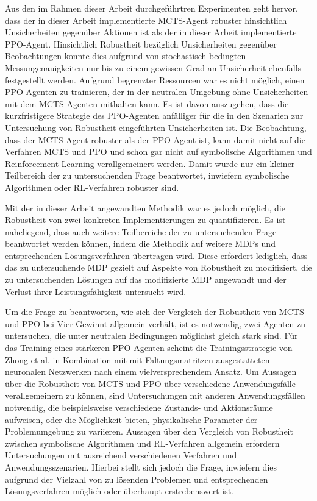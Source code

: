 Aus den im Rahmen dieser Arbeit durchgeführtren Experimenten geht hervor, dass der in dieser Arbeit implementierte MCTS-Agent robuster hinsichtlich Unsicherheiten gegenüber Aktionen ist als der in dieser Arbeit implementierte PPO-Agent. Hinsichtlich Robustheit bezüglich Unsicherheiten gegenüber Beobachtungen konnte dies aufgrund von stochastisch bedingten Messungenauigkeiten nur bis zu einem gewissen Grad an Unsicherheit ebenfalls festgestellt werden. Aufgrund begrenzter Ressourcen war es nicht möglich, einen PPO-Agenten zu trainieren, der in der neutralen Umgebung ohne Unsicherheiten mit dem MCTS-Agenten mithalten kann. Es ist davon auszugehen, dass die kurzfristigere Strategie des PPO-Agenten anfälliger für die in den Szenarien zur Untersuchung von Robustheit eingeführten Unsicherheiten ist. Die Beobachtung, dass der MCTS-Agent robuster als der PPO-Agent ist, kann damit nicht auf die Verfahren MCTS und PPO und schon gar nicht auf symbolische Algorithmen und Reinforcement Learning verallgemeinert werden. Damit wurde nur ein kleiner Teilbereich der zu untersuchenden Frage beantwortet, inwiefern symbolische Algorithmen oder RL-Verfahren robuster sind.

Mit der in dieser Arbeit angewandten Methodik war es jedoch möglich, die Robustheit von zwei konkreten Implementierungen zu quantifizieren. Es ist naheliegend, dass auch weitere Teilbereiche der zu untersuchenden Frage beantwortet werden können, indem die Methodik auf weitere MDPs und entsprechenden Lösungsverfahren übertragen wird. Diese erfordert lediglich, dass das zu untersuchende MDP gezielt auf Aspekte von Robustheit zu modifiziert, die zu untersuchenden Lösungen auf das modifizierte MDP angewandt und der Verlust ihrer Leistungsfähigkeit untersucht wird.

Um die Frage zu beantworten, wie sich der Vergleich der Robustheit von MCTS und PPO bei Vier Gewinnt allgemein verhält, ist es notwendig, zwei Agenten zu untersuchen, die unter neutralen Bedingungen möglichst gleich stark sind. Für das Training eines stärkeren PPO-Agenten scheint die Trainingsstrategie von Zhong et al. in Kombination mit mit Faltungsmatritzen ausgestatteten neuronalen Netzwerken nach einem vielversprechendem Ansatz. Um Aussagen über die Robustheit von MCTS und PPO über verschiedene Anwendungsfälle verallgemeinern zu können, sind Untersuchungen mit anderen Anwendungsfällen notwendig, die beispielsweise verschiedene Zustands- und Aktionsräume aufweisen, oder die Möglichkeit bieten, physikalische Parameter der Problemumgebung zu variieren. Aussagen über den Vergleich von Robustheit zwischen symbolische Algorithmen und RL-Verfahren allgemein erfordern Untersuchungen mit ausreichend verschiedenen Verfahren und Anwendungsszenarien. Hierbei stellt sich jedoch die Frage, inwiefern dies aufgrund der Vielzahl von zu lösenden Problemen und entsprechenden Lösungsverfahren möglich oder überhaupt erstrebenswert ist.
